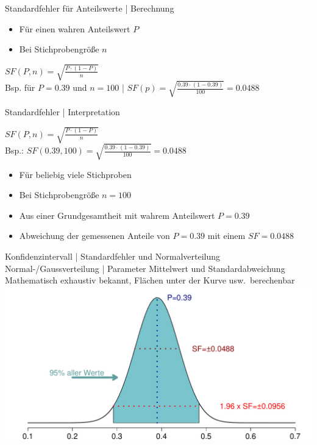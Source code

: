 \begin{frame}
  {Standardfehler für Anteilswerte | Berechnung}
  \begin{itemize}[<+->]
    \item Für einen wahren Anteilswert $P$
    \item Bei Stichprobengröße $n$
  \end{itemize}
  \Halbzeile
  \begin{center}
    \alert{$SF(P,n)=\sqrt{\frac{P\cdot(1-P)}{n}}$}\\
    \Doppelzeile
    Bsp. für $P=0.39$ und $n=100$ | $SF(p)=\sqrt{\frac{0.39\cdot(1-0.39)}{100}}=0.0488$
  \end{center}
\end{frame}

\begin{frame}
  {Standardfehler | Interpretation}
  \begin{center}
    \alert{$SF(P,n)=\sqrt{\frac{P\cdot(1-P)}{n}}$}\\

    \vspace{.1cm}
    Bsp.: $SF(0.39,100)=\sqrt{\frac{0.39\cdot(1-0.39)}{100}}=0.0488$
  \end{center}
  \Zeile
  \begin{itemize}[<+->]
    \item Für \alert{beliebig viele} Stichproben
    \item Bei \alert{Stichprobengröße $n=100$}
    \item Aus einer Grundgesamtheit mit \alert{wahrem Anteilswert $P=0.39$}
      \Halbzeile
    \item Abweichung der gemessenen Anteile von $P=0.39$ mit einem \alert{$SF=0.0488$}
  \end{itemize}
\end{frame}

\begin{frame}
  {Konfidenzintervall | Standardfehler und Normalverteilung}
  \alert{Normal-\slash Gaussverteilung} | Parameter \alert{Mittelwert} und \alert{Standardabweichung}\\
  \Viertelzeile
   Mathematisch exhaustiv bekannt, Flächen unter der Kurve usw.\ berechenbar\\
  \centering
  \includegraphics[height=0.75\textheight]{RVorlesung/ci95}
\end{frame}


